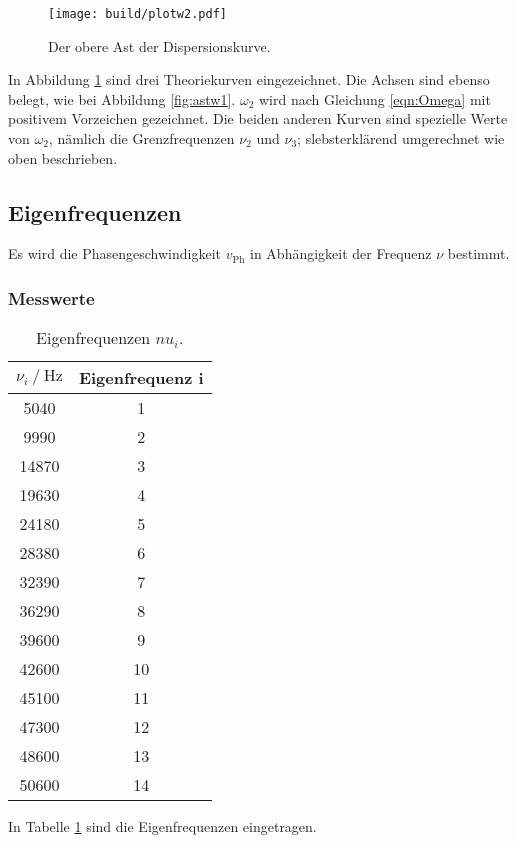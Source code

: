 \begin{figure}
  \centering
  \texttt{[image: build/plotw2.pdf]}
  \caption{Der obere Ast der Dispersionskurve.}
  \label{fig:astw2}
\end{figure}

In Abbildung \ref{fig:astw2} sind drei Theoriekurven eingezeichnet. Die Achsen
sind ebenso belegt, wie bei Abbildung \ref{fig:astw1}.
$\omega_2$ wird nach Gleichung \eqref{eqn:Omega} mit positivem Vorzeichen
gezeichnet. Die beiden anderen Kurven sind spezielle Werte von $\omega_2$,
nämlich die Grenzfrequenzen $\nu_2$ und $\nu_3$; slebsterklärend umgerechnet
wie oben beschrieben.

\subsection{Eigenfrequenzen}
Es wird die Phasengeschwindigkeit $v_{\text{Ph}}$ in Abhängigkeit der Frequenz
$\nu$ bestimmt.

\subsubsection{Messwerte}

\begin{table}[h]
  \centering
  \caption{Eigenfrequenzen $nu_i$.}
  \label{tab:nui}
  \begin{tabular}{c c}
    \toprule
     $\nu_i \:/\: \si{\hertz}$ & Eigenfrequenz i\\
    \midrule
    5040 & 1\\
    9990 & 2\\
    14870 & 3\\
    19630 & 4\\
    24180 & 5\\
    28380 & 6\\
    32390 & 7\\
    36290 & 8\\
    39600 & 9\\
    42600 & 10\\
    45100 & 11\\
    47300 & 12\\
    48600 & 13\\
    50600 & 14\\
    \bottomrule
  \end{tabular}
\end{table}

In Tabelle \ref{tab:nui} sind die Eigenfrequenzen eingetragen.

